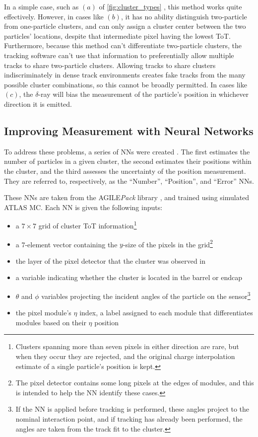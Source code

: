 In a simple case, such as $(a)$ of \autoref{fig:cluster_types} , this method works quite effectively. However, in cases like $(b)$, it has no ability distinguish two-particle from one-particle clusters, and can only assign a cluster center between the two particles' locations, despite that intermediate pixel having the lowest \ac{ToT}. Furthermore, because this method can't differentiate two-particle clusters, the tracking software can't use that information to preferentially allow multiple tracks to share two-particle clusters. Allowing tracks to share clusters indiscriminately in dense track environments creates fake tracks from the many possible cluster combinations, so this cannot be broadly permitted. In cases like $(c)$, the $\delta$-ray will bias the measurement of the particle's position in whichever direction it is emitted. 

\subsection{Improving Measurement with Neural Networks}

To address these problems, a series of \acp{NN} were created \cite{PERF-2012-05}. The first estimates the number of particles in a given cluster, the second estimates their positions within the cluster, and the third assesses the uncertainty of the position measurement. They are referred to, respectively, as the ``Number'', ``Position'', and ``Error'' \acp{NN}.

These \acp{NN} are taken from the AGILE\textit{Pack} library \cite{agile}, and trained using simulated \ac{ATLAS} \ac{MC}. Each \ac{NN} is given the following inputs: 
\begin{itemize}
\item a $7\times7$ grid of cluster \ac{ToT} information\footnote{Clusters spanning more than seven pixels in either direction are rare, but when they occur they are rejected, and the original charge interpolation estimate of a single particle's position is kept.}
\item a 7-element vector containing the $y$-size of the pixels in the grid\footnote{The pixel detector contains some long pixels at the edges of modules, and this is intended to help the \ac{NN} identify these cases.}
\item the layer of the pixel detector that the cluster was observed in
\item a variable indicating whether the cluster is located in the barrel or endcap
\item $\theta$ and $\phi$ variables projecting the incident angles of the particle on the sensor\footnote{If the \ac{NN} is applied before tracking is performed, these angles project to the nominal interaction point, and if tracking has already been performed, the angles are taken from the track fit to the cluster.}
\item the pixel module's $\eta$ index, a label assigned to each module that differentiates modules based on their $\eta$ position
\end{itemize}

